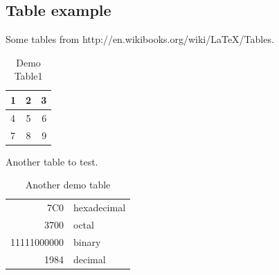 \documentclass[main.tex]{subfiles}
\begin{document}
    
    \subsection{Table example}
    Some tables from http://en.wikibooks.org/wiki/LaTeX/Tables.

\begin{table}[H]
    \begin{tabular}{ | l | c | r | }
        \hline
        1 & 2 & 3 \\
        \hline
        4 & 5 & 6 \\    
        \hline
        7 & 8 & 9 \\
        \hline
    \end{tabular}
  \caption{Demo Table1}
  \label{tab:demo_table1}
\end{table}

Another table to test.

\begin{table}[H]
    \begin{tabular}{|r|l|}
      \hline
      7C0 & hexadecimal \\
      3700 & octal \\ \cline{2-2}
      11111000000 & binary \\
      \hline \hline
      1984 & decimal \\
      \hline
    \end{tabular}
    \caption{Another demo table}
    \label{tab:demo_table2}
\end{table}
\end{document}
